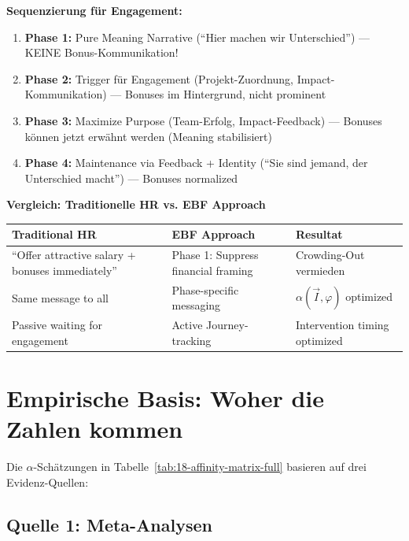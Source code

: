 \textbf{Sequenzierung für Engagement:}
\begin{enumerate}[nosep]
\item \textbf{Phase 1:} Pure Meaning Narrative (``Hier machen wir Unterschied'') — KEINE Bonus-Kommunikation!
\item \textbf{Phase 2:} Trigger für Engagement (Projekt-Zuordnung, Impact-Kommunikation) — Bonuses im Hintergrund, nicht prominent
\item \textbf{Phase 3:} Maximize Purpose (Team-Erfolg, Impact-Feedback) — Bonuses können jetzt erwähnt werden (Meaning stabilisiert)
\item \textbf{Phase 4:} Maintenance via Feedback + Identity (``Sie sind jemand, der Unterschied macht'') — Bonuses normalized
\end{enumerate}

\textbf{Vergleich: Traditionelle HR vs. EBF Approach}

\begin{center}
\small
\renewcommand{\arraystretch}{1.3}
\begin{tabular}{@{}lll@{}}
\toprule
\textbf{Traditional HR} & \textbf{EBF Approach} & \textbf{Resultat} \\
\midrule
``Offer attractive salary + bonuses immediately'' & Phase 1: Suppress financial framing & Crowding-Out vermieden \\
Same message to all & Phase-specific messaging & $\alpha(\vec{I}, \varphi)$ optimized \\
Passive waiting for engagement & Active Journey-tracking & Intervention timing optimized \\
\bottomrule
\end{tabular}
\end{center}

\section{Empirische Basis: Woher die Zahlen kommen}
\label{sec:18-empirical}

Die $\alpha$-Schätzungen in Tabelle~\ref{tab:18-affinity-matrix-full} basieren auf drei Evidenz-Quellen:

\subsection{Quelle 1: Meta-Analysen}

